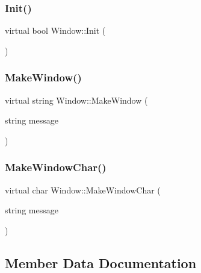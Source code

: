 \mbox{\label{classWindow_a91ad1340d4f60465f0e6eef38f0e5fb1}} 
\subsubsection{\texorpdfstring{Init()}{Init()}}
{\footnotesize\ttfamily virtual bool Window\+::\+Init (\begin{DoxyParamCaption}{ }\end{DoxyParamCaption})\hspace{0.3cm}{\ttfamily [pure virtual]}}

\mbox{\label{classWindow_a3a24c6368cb054a5ca3b32db2558319f}} 
\subsubsection{\texorpdfstring{Make\+Window()}{MakeWindow()}}
{\footnotesize\ttfamily virtual string Window\+::\+Make\+Window (\begin{DoxyParamCaption}\item[{string}]{message }\end{DoxyParamCaption})\hspace{0.3cm}{\ttfamily [pure virtual]}}

\mbox{\label{classWindow_ae770439748fb6b7dcdb3071860e687b3}} 
\subsubsection{\texorpdfstring{Make\+Window\+Char()}{MakeWindowChar()}}
{\footnotesize\ttfamily virtual char Window\+::\+Make\+Window\+Char (\begin{DoxyParamCaption}\item[{string}]{message }\end{DoxyParamCaption})\hspace{0.3cm}{\ttfamily [pure virtual]}}



\subsection{Member Data Documentation}
\mbox{\label{classWindow_a06739ea2d178febdb7f0da5f775e5ba8}} 
